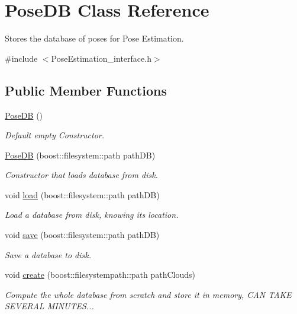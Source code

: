 \hypertarget{classPoseDB}{\section{Pose\-D\-B Class Reference}
\label{classPoseDB}
}


Stores the database of poses for Pose Estimation.  




{\ttfamily \#include $<$Pose\-Estimation\-\_\-interface.\-h$>$}

\subsection*{Public Member Functions}
\begin{DoxyCompactItemize}
\item 
\hyperlink{classPoseDB_a48e3cf9cde2b5f6a1a87e0d4f666e13f}{Pose\-D\-B} ()
\begin{DoxyCompactList}\small\item\em Default empty Constructor. \end{DoxyCompactList}\item 
\hyperlink{classPoseDB_ac7c624b7de4a42c229a9a96e1b90b0d2}{Pose\-D\-B} (boost\-::filesystem\-::path path\-D\-B)
\begin{DoxyCompactList}\small\item\em Constructor that loads database from disk. \end{DoxyCompactList}\item 
void \hyperlink{classPoseDB_a232d86fe04b8e6046c7fe90f285cfe8d}{load} (boost\-::filesystem\-::path path\-D\-B)
\begin{DoxyCompactList}\small\item\em Load a database from disk, knowing its location. \end{DoxyCompactList}\item 
void \hyperlink{classPoseDB_a3bc7a3f5efdbf367bf1be91ec4272f60}{save} (boost\-::filesystem\-::path path\-D\-B)
\begin{DoxyCompactList}\small\item\em Save a database to disk. \end{DoxyCompactList}\item 
void \hyperlink{classPoseDB_a90742e3484598d29d24250a0dfbd5ef1}{create} (boost\-::filesystempath\-::path path\-Clouds)
\begin{DoxyCompactList}\small\item\em Compute the whole database from scratch and store it in memory, C\-A\-N T\-A\-K\-E S\-E\-V\-E\-R\-A\-L M\-I\-N\-U\-T\-E\-S... \end{DoxyCompactList}\end{DoxyCompactItemize}
